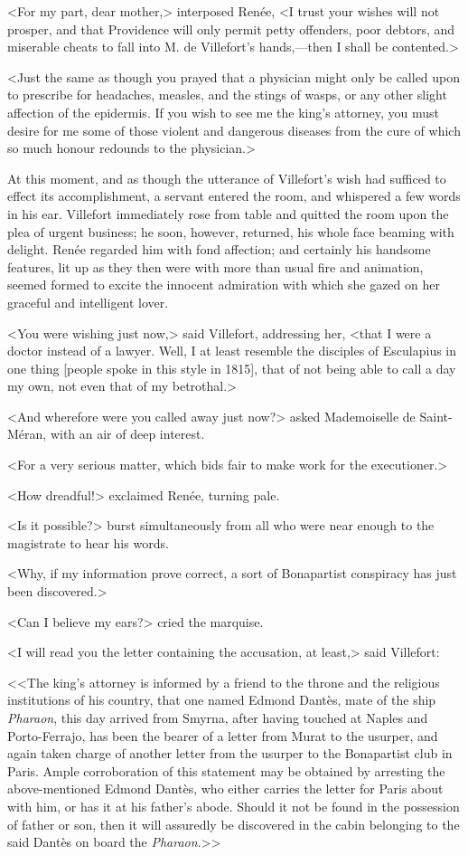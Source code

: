  <For my part, dear mother,> interposed Renée, <I trust your wishes will not prosper, and that Providence will only permit petty offenders, poor debtors, and miserable cheats to fall into M. de Villefort's hands,—then I shall be contented.> 

 <Just the same as though you prayed that a physician might only be called upon to prescribe for headaches, measles, and the stings of wasps, or any other slight affection of the epidermis. If you wish to see me the king's attorney, you must desire for me some of those violent and dangerous diseases from the cure of which so much honour redounds to the physician.> 

 At this moment, and as though the utterance of Villefort's wish had sufficed to effect its accomplishment, a servant entered the room, and whispered a few words in his ear. Villefort immediately rose from table and quitted the room upon the plea of urgent business; he soon, however, returned, his whole face beaming with delight. Renée regarded him with fond affection; and certainly his handsome features, lit up as they then were with more than usual fire and animation, seemed formed to excite the innocent admiration with which she gazed on her graceful and intelligent lover. 

 <You were wishing just now,> said Villefort, addressing her, <that I were a doctor instead of a lawyer. Well, I at least resemble the disciples of Esculapius in one thing [people spoke in this style in 1815], that of not being able to call a day my own, not even that of my betrothal.> 

 <And wherefore were you called away just now?> asked Mademoiselle de Saint-Méran, with an air of deep interest. 

 <For a very serious matter, which bids fair to make work for the executioner.> 

 <How dreadful!> exclaimed Renée, turning pale. 

 <Is it possible?> burst simultaneously from all who were near enough to the magistrate to hear his words. 

 <Why, if my information prove correct, a sort of Bonapartist conspiracy has just been discovered.> 

 <Can I believe my ears?> cried the marquise. 

 <I will read you the letter containing the accusation, at least,> said Villefort: 

 <<The king's attorney is informed by a friend to the throne and the religious institutions of his country, that one named Edmond Dantès, mate of the ship \textit{Pharaon}, this day arrived from Smyrna, after having touched at Naples and Porto-Ferrajo, has been the bearer of a letter from Murat to the usurper, and again taken charge of another letter from the usurper to the Bonapartist club in Paris. Ample corroboration of this statement may be obtained by arresting the above-mentioned Edmond Dantès, who either carries the letter for Paris about with him, or has it at his father's abode. Should it not be found in the possession of father or son, then it will assuredly be discovered in the cabin belonging to the said Dantès on board the \textit{Pharaon}.>> 

